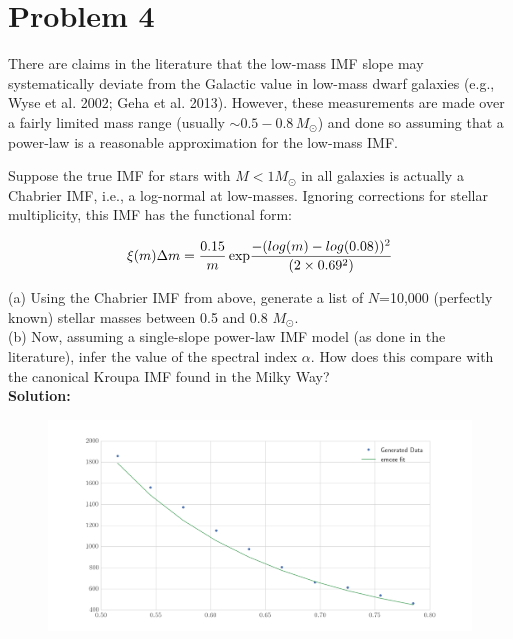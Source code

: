 \documentclass[12pt,usletter,english]{article}
\begin{document}
\section{Problem 4}

There are claims in the literature that the low-mass IMF slope may
systematically deviate from the Galactic value in low-mass dwarf
galaxies (e.g., Wyse et al. 2002; Geha et al. 2013).  However, these
measurements are made over a fairly limited mass range (usually $\sim
0.5- 0.8 \, M_{\odot}$) and done so assuming that a power-law is a
reasonable approximation for the low-mass IMF.

Suppose the true IMF for stars with $M<1 M_{\odot}$ in all galaxies is
actually a Chabrier IMF, i.e., a log-normal at low-masses.  Ignoring
corrections for stellar multiplicity, this IMF has the functional
form:

\begin{equation}
\xi(m)\Delta m = \frac{0.15}{m} \, {\rm exp}\frac{-(log(m) -
  log(0.08))^2}{(2\times0.69^2)}
\end{equation}

(a) Using the Chabrier IMF from above, generate a list of $N$=10,000
(perfectly known) stellar masses between 0.5 and 0.8 $M_{\odot}$.  \\

(b) Now, assuming a single-slope power-law IMF model (as done in the
literature), infer the value of the spectral index $\alpha$.  How does
this compare with the canonical Kroupa IMF found in the Milky Way?  \\

\noindent \textbf{Solution:}

\begin{figure}[!h]
  \centering \includegraphics[width=13cm]{lognormal.png}
  \caption{
    \label{fig:lognorm}}
\end{figure}
\end{document}
